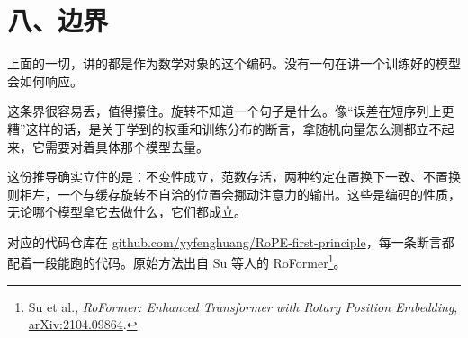 \section{八、边界}

上面的一切，讲的都是作为数学对象的这个编码。没有一句在讲一个训练好的模型会如何响应。

这条界很容易丢，值得攥住。旋转不知道一个句子是什么。像“误差在短序列上更糟”这样的话，是关于学到的权重和训练分布的断言，拿随机向量怎么测都立不起来，它需要对着具体那个模型去量。

这份推导确实立住的是：不变性成立，范数存活，两种约定在置换下一致、不置换则相左，一个与缓存旋转不自洽的位置会挪动注意力的输出。这些是编码的性质，无论哪个模型拿它去做什么，它们都成立。

对应的代码仓库在 \href{https://github.com/yyfenghuang/RoPE-first-principle}{github.com/yyfenghuang/RoPE-first-principle}，每一条断言都配着一段能跑的代码。原始方法出自 Su 等人的 RoFormer\footnote{Su et al., \emph{RoFormer: Enhanced Transformer with Rotary Position Embedding}, \href{https://arxiv.org/abs/2104.09864}{arXiv:2104.09864}.}。


